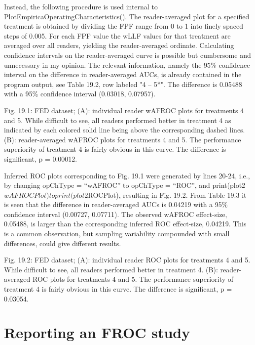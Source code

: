 \documentclass[
]{book}
\begin{document}
Instead, the following procedure is used internal to PlotEmpiricaOperatingCharacteristics(). The reader-averaged plot for a specified treatment is obtained by dividing the FPF range from 0 to 1 into finely spaced steps of 0.005. For each FPF value the wLLF values for that treatment are averaged over all readers, yielding the reader-averaged ordinate. Calculating confidence intervals on the reader-averaged curve is possible but cumbersome and unnecessary in my opinion. The relevant information, namely the 95\% confidence interval on the difference in reader-averaged AUCs, is already contained in the program output, see Table 19.2, row labeled "4 -- 5*". The difference is 0.05488 with a 95\% confidence interval (0.03018, 0.07957).

Fig. 19.1: FED dataset; (A): individual reader wAFROC plots for treatments 4 and 5. While difficult to see, all readers performed better in treatment 4 as indicated by each colored solid line being above the corresponding dashed lines. (B): reader-averaged wAFROC plots for treatments 4 and 5. The performance superiority of treatment 4 is fairly obvious in this curve. The difference is significant, p = 0.00012.

Inferred ROC plots corresponding to Fig. 19.1 were generated by lines 20-24, i.e., by changing opChType = ``wAFROC'' to opChType = ``ROC'', and print(plot2\(wAFROCPlot) to print(plot2\)ROCPlot), resulting in Fig. 19.2. From Table 19.3 it is seen that the difference in reader-averaged AUCs is 0.04219 with a 95\% confidence interval (0.00727, 0.07711). The observed wAFROC effect-size, 0.05488, is larger than the corresponding inferred ROC effect-size, 0.04219. This is a common observation, but sampling variability compounded with small differences, could give different results.

Fig. 19.2: FED dataset; (A): individual reader ROC plots for treatments 4 and 5. While difficult to see, all readers performed better in treatment 4. (B): reader-averaged ROC plots for treatments 4 and 5. The performance superiority of treatment 4 is fairly obvious in this curve. The difference is significant, p = 0.03054.

\hypertarget{analyzing-froc-data-reporting}{%
\section{Reporting an FROC study}\label{analyzing-froc-data-reporting}}
\end{document}
